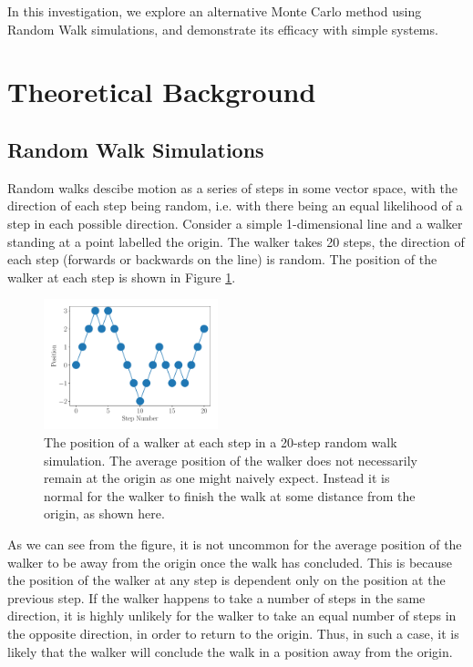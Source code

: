 \documentclass[journal]{IEEEtran}
\begin{document}
In this investigation, we explore an alternative Monte Carlo method using Random
Walk simulations, and demonstrate its efficacy with simple systems.

\section{Theoretical Background}
\label{sec:TheoreticalBackground}

\subsection{Random Walk Simulations}

Random walks descibe motion as a series of steps in some vector space, with the
direction of each step being random, i.e. with there being an equal likelihood
of a step in each possible direction. Consider a simple 1-dimensional line and a
walker standing at a point labelled the origin. The walker takes 20 steps, the
direction of each step (forwards or backwards on the line) is random. The
position of the walker at each step is shown in Figure \ref{fig:cartoon}.

\begin{figure}[H]%
  \begin{center}
    \includegraphics[width=0.45\textwidth]{images/cartoon.pdf}
    \caption{The position of a walker at each step in a 20-step random walk
      simulation. The average position of the walker does not necessarily remain
      at the origin as one might naively expect. Instead it is normal for the
      walker to finish the walk at some distance from the origin, as shown here.}
    \label{fig:cartoon}
  \end{center}
\end{figure}

As we can see from the figure, it is not uncommon for the average position of
the walker to be away from the origin once the walk has concluded. This is
because the position of the walker at any step is dependent only on the position
at the previous step. If the walker happens to take a number of steps in the
same direction, it is highly unlikely for the walker to take an equal number of
steps in the opposite direction, in order to return to the origin. Thus, in such
a case, it is likely that the walker will conclude the walk in a position away
from the origin.
\end{document}
